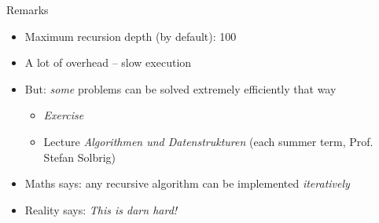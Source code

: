 
\begin{frame}[fragile]
%
	\begin{codebox}
		\begin{codebox}
			\begin{codebox}
				\begin{codebox}
				\scriptsize{}
				\end{codebox}
				\scriptsize{}
			\end{codebox}
			\scriptsize{}
		\end{codebox}
		\scriptsize{}
	\end{codebox}
%
\end{frame}



\begin{frame}{Remarks}
%
\begin{itemize}
\item Maximum recursion depth (by default): 100
\item A lot of overhead -- slow execution
\item But: \emph{some} problems can be solved extremely efficiently that way
	\begin{itemize}
	\item [\thus] \emph{Exercise}
	\item [\thus] Lecture \emph{Algorithmen und Datenstrukturen} (each summer term, Prof. Stefan Solbrig)
	\end{itemize}
\item Maths says: any recursive algorithm can be implemented \emph{iteratively}
\item Reality says: \emph{This is darn hard!}
\end{itemize}
%
\end{frame}